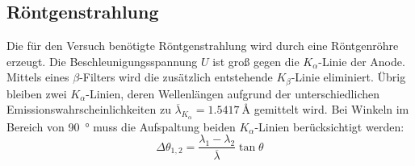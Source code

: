 
\subsection{Röntgenstrahlung}%
\label{sub:roentgenstrahlung}
Die für den Versuch benötigte Röntgenstrahlung wird durch eine Röntgenröhre erzeugt.
Die Beschleunigungsspannung $U$ ist groß gegen die $K_\alpha$-Linie der Anode.
Mittels eines $\beta$-Filters wird die zusätzlich entstehende $K_\beta$-Linie eliminiert.
Übrig bleiben zwei $K_\alpha$-Linien, deren Wellenlängen aufgrund der unterschiedlichen
Emissionswahrscheinlichkeiten zu $\overline{\lambda}_{K_\alpha} = \SI{1.5417}{\angstrom}$
gemittelt wird.
Bei Winkeln im Bereich von \SI{90}{\degree} muss die Aufspaltung beiden $K_\alpha$-Linien
berücksichtigt werden:
\begin{equation}
  \Delta \theta_{1, 2} = \frac{\lambda_1 - \lambda_2}{\overline{\lambda}} \tan{\theta}
\end{equation}

